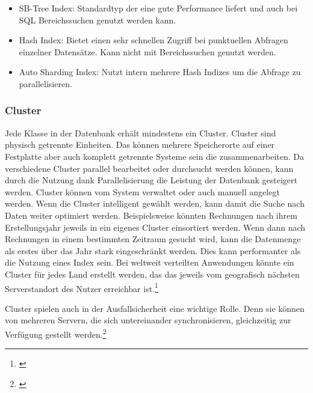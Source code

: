 \begin{itemize}
    \item SB-Tree Index: Standardtyp der eine gute Performance liefert und auch bei \gls{SQL} Bereichssuchen genutzt werden kann.
    \item Hash Index: Bietet einen sehr schnellen Zugriff bei punktuellen Abfragen einzelner Datensätze. Kann nicht mit Bereichssuchen genutzt werden.
    \item Auto Sharding Index: Nutzt intern mehrere Hash Indizes um die Abfrage zu parallelisieren.
\end{itemize}


\subsubsection{Cluster}


Jede Klasse in der Datenbank erhält mindestens ein Cluster. Cluster sind physisch getrennte Einheiten. Das können mehrere Speicherorte auf einer Festplatte aber auch komplett getrennte Systeme sein die zusammenarbeiten. Da verschiedene Cluster parallel bearbeitet oder durchsucht werden können, kann durch die Nutzung dank Parallelisierung die Leistung der Datenbank gesteigert werden. Cluster können vom System verwaltet oder auch manuell angelegt werden. Wenn die Cluster intelligent gewählt werden, kann damit die Suche nach Daten weiter optimiert werden. Beispielsweise könnten Rechnungen nach ihrem Erstellungsjahr jeweils in ein eigenes Cluster einsortiert werden. Wenn dann nach Rechnungen in einem bestimmten Zeitraum gesucht wird, kann die Datenmenge als erstes über das Jahr stark eingeschränkt werden. Dies kann performanter als die Nutzung eines Index sein. Bei weltweit verteilten Anwendungen könnte ein Cluster für jedes Land erstellt werden, das das jeweils vom geografisch nächsten Serverstandort des Nutzer erreichbar ist.\footnote{\cite[Vgl.][]{OrientDBClusters}}

Cluster spielen auch in der Ausfallsicherheit eine wichtige Rolle. Denn sie können von mehreren Servern, die sich untereinander synchronisieren, gleichzeitig zur Verfügung gestellt werden.\footnote{\cite[Vgl.][]{OrientDBDistributedArchitecture}}

